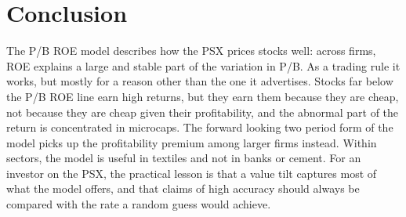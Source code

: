 \documentclass[11pt]{article}
\begin{document}
\section{Conclusion}\label{sec:conclusion}

The P/B ROE model describes how the PSX prices stocks well: across firms, ROE explains a large and
stable part of the variation in P/B. As a trading rule it works, but mostly for a reason other than
the one it advertises. Stocks far below the P/B ROE line earn high returns, but they earn them because
they are cheap, not because they are cheap given their profitability, and the abnormal part of the
return is concentrated in microcaps. The forward looking two period form of the model picks up the
profitability premium among larger firms instead. Within sectors, the model is useful in textiles and
not in banks or cement. For an investor on the PSX, the practical lesson is that a value tilt
captures most of what the model offers, and that claims of high accuracy should always be compared
with the rate a random guess would achieve.
\end{document}
